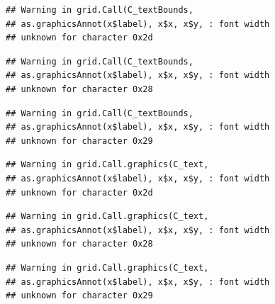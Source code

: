 \documentclass[
]{book}
\begin{document}
\begin{verbatim}
## Warning in grid.Call(C_textBounds,
## as.graphicsAnnot(x$label), x$x, x$y, : font width
## unknown for character 0x2d
\end{verbatim}

\begin{verbatim}
## Warning in grid.Call(C_textBounds,
## as.graphicsAnnot(x$label), x$x, x$y, : font width
## unknown for character 0x28
\end{verbatim}

\begin{verbatim}
## Warning in grid.Call(C_textBounds,
## as.graphicsAnnot(x$label), x$x, x$y, : font width
## unknown for character 0x29
\end{verbatim}

\begin{verbatim}
## Warning in grid.Call.graphics(C_text,
## as.graphicsAnnot(x$label), x$x, x$y, : font width
## unknown for character 0x2d
\end{verbatim}

\begin{verbatim}
## Warning in grid.Call.graphics(C_text,
## as.graphicsAnnot(x$label), x$x, x$y, : font width
## unknown for character 0x28
\end{verbatim}

\begin{verbatim}
## Warning in grid.Call.graphics(C_text,
## as.graphicsAnnot(x$label), x$x, x$y, : font width
## unknown for character 0x29
\end{verbatim}
\end{document}
